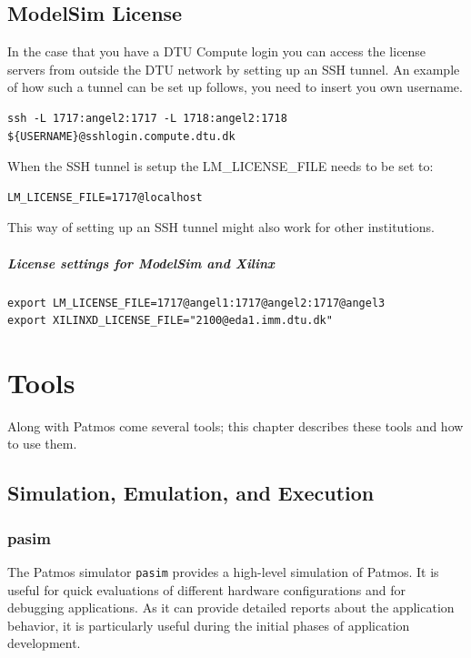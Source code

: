 \documentclass[a4paper,fontsize=10pt,twoside,DIV15,BCOR12mm,headinclude=true,footinclude=false,pagesize,bibtotoc]{scrbook}
\begin{document}
\section{ModelSim License}
In the case that you have a DTU Compute login you can access the license servers from outside the DTU network by setting up an SSH tunnel.
An example of how such a tunnel can be set up follows, you need to insert you own username.

\begin{verbatim}
ssh -L 1717:angel2:1717 -L 1718:angel2:1718 ${USERNAME}@sshlogin.compute.dtu.dk
\end{verbatim}

When the SSH tunnel is setup the LM\_LICENSE\_FILE needs to be set to:
\begin{verbatim}
LM_LICENSE_FILE=1717@localhost
\end{verbatim}

This way of setting up an SSH tunnel might also work for other institutions.

\paragraph{License settings for ModelSim and Xilinx}

\begin{verbatim}
export LM_LICENSE_FILE=1717@angel1:1717@angel2:1717@angel3
export XILINXD_LICENSE_FILE="2100@eda1.imm.dtu.dk"
\end{verbatim}





\chapter{Tools}

Along with Patmos come several tools; this chapter describes these
tools and how to use them.

\section{Simulation, Emulation, and Execution}

\subsection{pasim}

The Patmos simulator \texttt{pasim} provides a high-level simulation
of Patmos. It is useful for quick evaluations of different hardware
configurations and for debugging applications. As it can provide
detailed reports about the application behavior, it is particularly
useful during the initial phases of application development.
\end{document}
